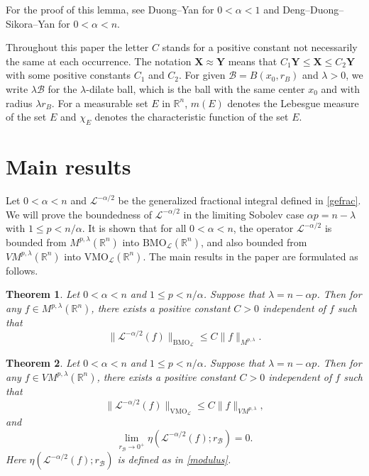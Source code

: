 \documentclass[10pt, reqno]{amsart}
\newtheorem{theorem}{Theorem}[section]
\theoremstyle{definition}
\theoremstyle{remark}
\numberwithin{equation}{section}
\begin{document}
For the proof of this lemma, see Duong--Yan
\cite[Lemma 3.1]{duong1} for $0<\alpha<1$ and Deng--Duong--Sikora--Yan \cite[Lemma 5.3]{deng} for $0<\alpha<n$.

Throughout this paper the letter $C$ stands for a positive constant not necessarily the same at each occurrence. The notation $\mathbf{X}\approx\mathbf{Y}$ means that $C_1\mathbf{Y}\leq \mathbf{X}\leq C_2\mathbf{Y}$ with some positive constants $C_1$ and $C_2$. For given $\mathcal{B}=B(x_0,r_{B})$ and $\lambda>0$, we write $\lambda \mathcal{B}$ for the $\lambda$-dilate ball, which is the ball with the same center $x_0$ and with radius $\lambda r_{B}$. For a measurable set $E$ in $\mathbb R^n$, $m(E)$ denotes the Lebesgue measure of the set $E$ and $\chi_{E}$ denotes the characteristic function of the set $E$.

\section{Main results}
Let $0<\alpha<n$ and $\mathcal L^{-\alpha/2}$ be the generalized fractional integral defined in \eqref{gefrac}. We will prove the boundedness of $\mathcal L^{-\alpha/2}$ in the limiting Sobolev case $\alpha p=n-\lambda$ with $1\leq p<n/{\alpha}$. It is shown that for all $0<\alpha<n$, the operator $\mathcal L^{-\alpha/2}$ is bounded from ${M}^{p,\lambda}(\mathbb R^n)$ into $\mathrm{BMO}_{\mathcal{L}}(\mathbb R^n)$, and also bounded from $V{M}^{p,\lambda}(\mathbb R^n)$ into $\mathrm{VMO}_{\mathcal{L}}(\mathbb R^n)$. The main results in the paper are formulated as follows.
\begin{theorem}\label{thm1}
Let $0<\alpha< n$ and $1\leq p<n/{\alpha}$. Suppose that $\lambda=n-\alpha p$. Then for any $f\in{M}^{p,\lambda}(\mathbb R^n)$, there exists a positive constant $C>0$ independent of $f$ such that
\begin{equation*}
\big\|\mathcal L^{-\alpha/2}(f)\big\|_{\mathrm{BMO}_{\mathcal{L}}}
\leq C\big\|f\big\|_{{M}^{p,\lambda}}.
\end{equation*}
\end{theorem}

\begin{theorem}\label{thm2}
Let $0<\alpha<n$ and $1\leq p<n/{\alpha}$. Suppose that $\lambda=n-\alpha p$. Then for any $f\in V{M}^{p,\lambda}(\mathbb R^n)$, there exists a positive constant $C>0$ independent of $f$ such that
\begin{equation*}
\big\|\mathcal L^{-\alpha/2}(f)\big\|_{\mathrm{VMO}_{\mathcal{L}}}
\leq C\big\|f\big\|_{V{M}^{p,\lambda}},
\end{equation*}
and
\begin{equation*}
\lim_{r_{\mathcal{B}}\to 0^{+}}\eta(\mathcal L^{-\alpha/2}(f);r_{\mathcal{B}})=0.
\end{equation*}
Here $\eta(\mathcal L^{-\alpha/2}(f);r_{\mathcal{B}})$ is defined as in \eqref{modulus}.
\end{theorem}
\end{document}
